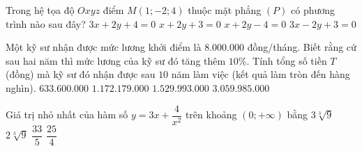 \begin{ex}%
Trong hệ tọa độ $Oxyz$ điểm $M(1;-2;4)$ thuộc mặt phẳng $(P)$ có phương trình nào sau đây?
\choice
{$3x+2y+4=0$}
{\True $x+2y+3=0$}
{$x+2y-4=0$}
{$3x-2y+3=0$}
\end{ex}

\begin{ex}%
	Một kỹ sư nhận được mức lương khởi điểm là $8.000.000$ đồng/tháng. Biết rằng cứ sau hai năm thì mức lương của kỹ sư đó tăng thêm $10\%$. Tính tổng số tiền $T$ (đồng) mà kỹ sư đó nhận được sau $10$ năm làm việc (kết quả làm tròn đến hàng nghìn).
	\choice
	{$633.600.000$}
	{\True $1.172.179.000$}
	{$1.529.993.000$}
	{$3.059.985.000$}
\end{ex}

\begin{ex}%
	Giá trị nhỏ nhất của hàm số $y=3x+\dfrac{4}{x^2}$ trên khoảng $(0;+\infty)$ bằng
	\choice
	{\True $3\sqrt[3]{9}$}
	{$2\sqrt[3]{9}$}
	{$\dfrac{33}{5}$}
	{$\dfrac{25}{4}$}
\end{ex}

